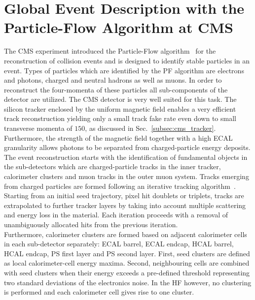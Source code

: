 \section{Global Event Description with the Particle-Flow Algorithm at CMS}
\label{sec:pf_algo}
The CMS experiment introduced the Particle-Flow algorithm~\cite{CMS-PAS-PFT-09-001} for the reconstruction of collision events and is designed to identify stable particles in an event. Types of particles which are identified by the PF algorithm are electrons and photons, charged and neutral hadrons as well as muons. In order to reconstruct the four-momenta of these particles all sub-components of the detector are utilized. The CMS detector is very well suited for this task. The silicon tracker enclosed by the uniform magnetic field enables a very efficient track reconstruction yielding only a small track fake rate even down to small transverse momenta of $150$\mev, as discussed in Sec.~\ref{subsec:cms_tracker}. Furthermore, the strength of the magnetic field together with a high ECAL granularity allows photons to be separated from charged-particle energy deposits. \\ 
The event reconstruction starts with the identification of fundamental objects in the sub-detectors which are charged-particle tracks in the inner tracker, calorimeter clusters and muon tracks in the outer muon system. Tracks emerging from charged particles are formed following an iterative tracking algorithm~\cite{Adam:934067}. Starting from an initial seed trajectory, \eg pixel hit doublets or triplets, tracks are extrapolated to further tracker layers by taking into account multiple scattering and energy loss in the material. Each iteration proceeds with a removal of unambiguously allocated hits from the previous iteration. \\
Furthermore, calorimeter clusters are formed based on adjacent calorimeter cells in each sub-detector separately: ECAL barrel, ECAL endcap, HCAL barrel, HCAL endcap, PS first layer and PS second layer. First, seed clusters are defined as local calorimeter-cell energy maxima. Second, neighbouring cells are combined with seed clusters when their energy exceeds a pre-defined threshold representing two standard deviations of the electronics noise. In the HF however, no clustering is performed and each calorimeter cell gives rise to one cluster. \\
